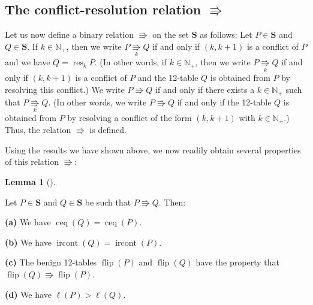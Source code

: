 \documentclass[numbers=enddot,12pt,final,onecolumn,notitlepage]{scrartcl}%
\theoremstyle{definition}
\newtheorem{lem}[theo]{Lemma}
\newenvironment{lemma}[1][]
{\begin{lem}[#1]\begin{leftbar}}
{\end{leftbar}\end{lem}}
\begin{document}
\subsection{The conflict-resolution relation $\Rrightarrow$}

Let us now define a binary relation $\Rrightarrow$ on the set $\mathbf{S}$ as
follows: Let $P\in\mathbf{S}$ and $Q\in\mathbf{S}$. If $k\in\mathbb{N}_{+}$,
then we write $P\underset{k}{\Rrightarrow}Q$ if and only if $\left(
k,k+1\right)  $ is a conflict of $P$ and we have $Q=\operatorname*{res}%
\nolimits_{k}P$. (In other words, if $k\in\mathbb{N}_{+}$, then we write
$P\underset{k}{\Rrightarrow}Q$ if and only if $\left(  k,k+1\right)  $ is a
conflict of $P$ and the 12-table $Q$ is obtained from $P$ by resolving this
conflict.) We write $P\Rrightarrow Q$ if and only if there exists a
$k\in\mathbb{N}_{+}$ such that $P\underset{k}{\Rrightarrow}Q$. (In other
words, we write $P\Rrightarrow Q$ if and only if the 12-table $Q$ is obtained
from $P$ by resolving a conflict of the form $\left(  k,k+1\right)  $ with
$k\in\mathbb{N}_{+}$.) Thus, the relation $\Rrightarrow$ is defined.

Using the results we have shown above, we now readily obtain several
properties of this relation $\Rrightarrow$:

\begin{lemma}
\label{lem.conflict-resolution-props}Let $P\in\mathbf{S}$ and $Q\in\mathbf{S}$
be such that $P\Rrightarrow Q$. Then:

\textbf{(a)} We have $\operatorname*{ceq}\left(  Q\right)
=\operatorname*{ceq}\left(  P\right)  $.

\textbf{(b)} We have $\operatorname*{ircont}\left(  Q\right)
=\operatorname*{ircont}\left(  P\right)  $.

\textbf{(c)} The benign 12-tables $\operatorname*{flip}\left(  P\right)  $ and
$\operatorname*{flip}\left(  Q\right)  $ have the property that
$\operatorname*{flip}\left(  Q\right)  \Rrightarrow\operatorname*{flip}\left(
P\right)  $.

\textbf{(d)} We have $\ell\left(  P\right)  >\ell\left(  Q\right)  $.
\end{lemma}
\end{document}
